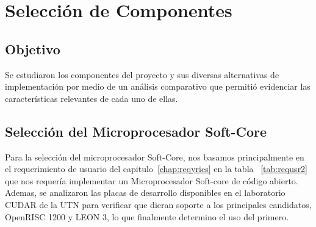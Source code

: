 \chapter{Selección de Componentes}

\section{Objetivo}
			Se estudiaron los componentes del proyecto y sus diversas alternativas de implementación por medio de un análisis comparativo que permitió evidenciar las características relevantes de cada uno de ellas.

\section{Selección del Microprocesador Soft-Core}

Para la selección del microprocesador Soft-Core, nos basamos principalmente en el requerimiento de usuario del capitulo~\ref{chap:reqyries} en la tabla ~\ref{tab:requsr2} que nos requería implementar un Microprocesador Soft-core de código abierto. Ademas, se analizaron las placas de desarrollo disponibles en el laboratorio CUDAR de la UTN para verificar que dieran soporte a los principales candidatos, OpenRISC 1200 y LEON 3, lo que finalmente determino el uso del primero.

		    			
